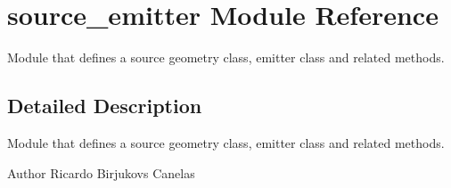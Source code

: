 \hypertarget{namespacesource__emitter}{}\section{source\+\_\+emitter Module Reference}
\label{namespacesource__emitter}


Module that defines a source geometry class, emitter class and related methods.  




\subsection{Detailed Description}
Module that defines a source geometry class, emitter class and related methods. 

\begin{DoxyAuthor}{Author}
Ricardo Birjukovs Canelas 
\end{DoxyAuthor}
